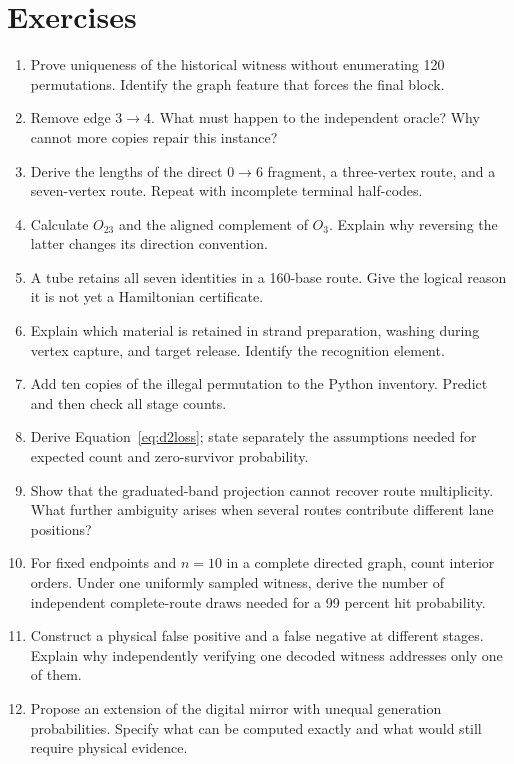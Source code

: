 \section{Exercises}
\begin{enumerate}
\item Prove uniqueness of the historical witness without enumerating 120 permutations. Identify the graph feature that forces the final block.
\item Remove edge $3\to4$. What must happen to the independent oracle? Why cannot more copies repair this instance?
\item Derive the lengths of the direct $0\to6$ fragment, a three-vertex route, and a seven-vertex route. Repeat with incomplete terminal half-codes.
\item Calculate $O_{23}$ and the aligned complement of $O_3$. Explain why reversing the latter changes its direction convention.
\item A tube retains all seven identities in a 160-base route. Give the logical reason it is not yet a Hamiltonian certificate.
\item Explain which material is retained in strand preparation, washing during vertex capture, and target release. Identify the recognition element.
\item Add ten copies of the illegal permutation to the Python inventory. Predict and then check all stage counts.
\item Derive Equation~\ref{eq:d2loss}; state separately the assumptions needed for expected count and zero-survivor probability.
\item Show that the graduated-band projection cannot recover route multiplicity. What further ambiguity arises when several routes contribute different lane positions?
\item For fixed endpoints and $n=10$ in a complete directed graph, count interior orders. Under one uniformly sampled witness, derive the number of independent complete-route draws needed for a 99 percent hit probability.
\item Construct a physical false positive and a false negative at different stages. Explain why independently verifying one decoded witness addresses only one of them.
\item Propose an extension of the digital mirror with unequal generation probabilities. Specify what can be computed exactly and what would still require physical evidence.
\end{enumerate}

